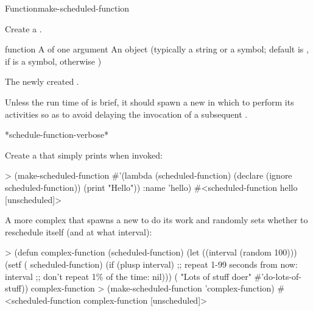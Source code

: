 
\begin{functiondoc}{Function}{make-scheduled-function}{ 
     
    \returns{} } 
%
%
%
%

\fnsyntax

\fnpurpose Create a .

\fnpackage {}

\fnmodule {}

\fnargs
\begin{args}{function}
\arg[function] A  of one argument
\arg[name] An object (typically a string or a symbol; default is
, if  is a symbol, otherwise \nil)
\end{args}

\fnreturns The newly created . 

\fnerrors
\nothreads{}

\fndescription Unless the run time of  is brief, it
should spawn a new  in which to perform its activities
so as to avoid delaying the invocation of a subsequent
.

\begin{alsos}{*schedule-function-verbose*}
\end{alsos}

\fnexamples
Create a  that simply prints  when invoked:
\begin{example}
> (make-scheduled-function 
    #'(lambda (scheduled-function)
        (declare (ignore scheduled-function))
        (print "Hello"))
    :name 'hello)
#<scheduled-function hello [unscheduled]>
\end{example}

%
%
A more complex  that spawns a new  to do its
work and randomly sets whether to reschedule itself (and at what interval):
\begin{example}
> (defun complex-function (scheduled-function)
    (let ((interval (random 100)))
      (setf ( scheduled-function)
            (if (plusp interval) 
                ;; repeat 1-99 seconds from now:
                interval
                ;; don't repeat 1\% of the time:
                nil)))
    ( "Lots of stuff doer" #'do-lots-of-stuff))
complex-function
> (make-scheduled-function 'complex-function)
#<scheduled-function complex-function [unscheduled]>
\end{example}


\end{functiondoc}

